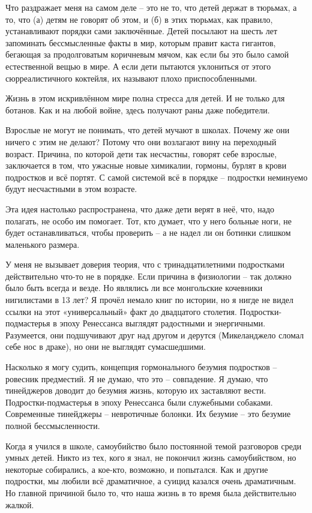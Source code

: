 \documentclass[ebook,12pt,oneside,openany]{memoir}
\begin{document}
Что раздражает меня на самом деле – это не то, что детей держат в
тюрьмах, а то, что (а) детям не говорят об этом, и (б) в этих тюрьмах,
как правило, устанавливают порядки сами заключённые. Детей посылают на
шесть лет запоминать бессмысленные факты в мир, которым правит каста
гигантов, бегающая за продолговатым коричневым мячом, как если бы это
было самой естественной вещью в мире. А если дети пытаются уклониться
от этого сюрреалистичного коктейля, их называют плохо
приспособленными.


Жизнь в этом искривлённом мире полна стресса для детей. И не только
для ботанов. Как и на любой войне, здесь получают раны даже
победители.

Взрослые не могут не понимать, что детей мучают в школах. Почему же
они ничего с этим не делают? Потому что они возлагают вину на
переходный возраст. Причина, по которой дети так несчастны, говорят
себе взрослые, заключается в том, что ужасные новые химикалии,
гормоны, бурлят в крови подростков и всё портят. С самой системой всё
в порядке – подростки неминуемо будут несчастными в этом возрасте.

Эта идея настолько распространена, что даже дети верят в неё, что,
надо полагать, не особо им помогает. Тот, кто думает, что у него
больные ноги, не будет останавливаться, чтобы проверить – а не надел
ли он ботинки слишком маленького размера.

У меня не вызывает доверия теория, что с тринадцатилетними подростками
действительно что-то не в порядке. Если причина в физиологии – так
должно было быть всегда и везде. Но являлись ли все монгольские
кочевники нигилистами в 13 лет? Я прочёл немало книг по истории, но я
нигде не видел ссылки на этот «универсальный» факт до двадцатого
столетия. Подростки-подмастерья в эпоху Ренессанса выглядят радостными
и энергичными. Разумеется, они подшучивают друг над другом и дерутся
(Микеланджело сломал себе нос в драке), но они не выглядят
сумасшедшими.

Насколько я могу судить, концепция гормонального безумия подростков –
ровесник предместий. Я не думаю, что это – совпадение. Я думаю, что
тинейджеров доводит до безумия жизнь, которую их заставляют вести.
Подростки-подмастерья в эпоху Ренессанса были служебными собаками.
Современные тинейджеры – невротичные болонки. Их безумие – это безумие
полной бессмысленности.


Когда я учился в школе, самоубийство было постоянной темой разговоров
среди умных детей. Никто из тех, кого я знал, не покончил жизнь
самоубийством, но некоторые собирались, а кое-кто, возможно, и
попытался. Как и другие подростки, мы любили всё драматичное, а суицид
казался очень драматичным. Но главной причиной было то, что наша жизнь
в то время была действительно жалкой.
\end{document}
